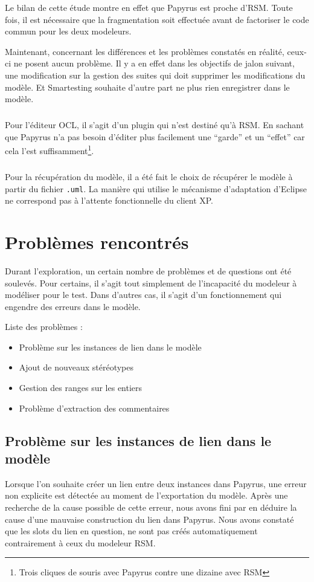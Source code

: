 Le bilan de cette étude montre en effet que Papyrus est proche d'RSM.
Toute fois, il est nécessaire que la fragmentation soit effectuée avant de factoriser le code commun pour les deux modeleurs.

Maintenant, concernant les différences et les problèmes constatés en réalité, ceux-ci ne posent aucun problème.
Il y a en effet dans les objectifs de jalon suivant, une modification sur la gestion des suites qui doit supprimer les modifications du modèle. 
Et Smartesting souhaite d'autre part ne plus rien enregistrer dans le modèle.

\subparagraph*{}
Pour l'éditeur OCL, il s'agit d'un plugin qui n'est destiné qu'à RSM.
En sachant que Papyrus n'a pas besoin d'éditer plus facilement une ``garde'' et un ``effet'' car cela l'est suffisamment\footnote{Trois cliques de souris avec Papyrus contre une dizaine avec RSM}.

\subparagraph*{}
Pour la récupération du modèle, il a été fait le choix de récupérer le modèle à partir du fichier \texttt{.uml}.
La manière qui utilise le mécanisme d'adaptation d'Eclipse ne correspond pas à l'attente fonctionnelle du client XP.

\section{Problèmes rencontrés}

Durant l'exploration, un certain nombre de problèmes et de questions ont été soulevés.
Pour certains, il s'agit tout simplement de l'incapacité du modeleur à modéliser pour le test.
Dans d'autres cas, il s'agit d'un fonctionnement qui engendre des erreurs dans le modèle.

Liste des problèmes :
\begin{itemize}
  \item Problème sur les instances de lien dans le modèle
  \item Ajout de nouveaux stéréotypes
  \item Gestion des ranges sur les entiers
  \item Problème d'extraction des commentaires
\end{itemize}

\subsection{Problème sur les instances de lien dans le modèle}

Lorsque l'on souhaite créer un lien entre deux instances dans Papyrus, une erreur non explicite est détectée au moment de l'exportation du modèle.
Après une recherche de la cause possible de cette erreur, nous avons fini par en déduire la cause d'une mauvaise construction du lien dans Papyrus. 
Nous avons constaté que les slots du lien en question, ne sont pas créés automatiquement contrairement à ceux du modeleur RSM.

